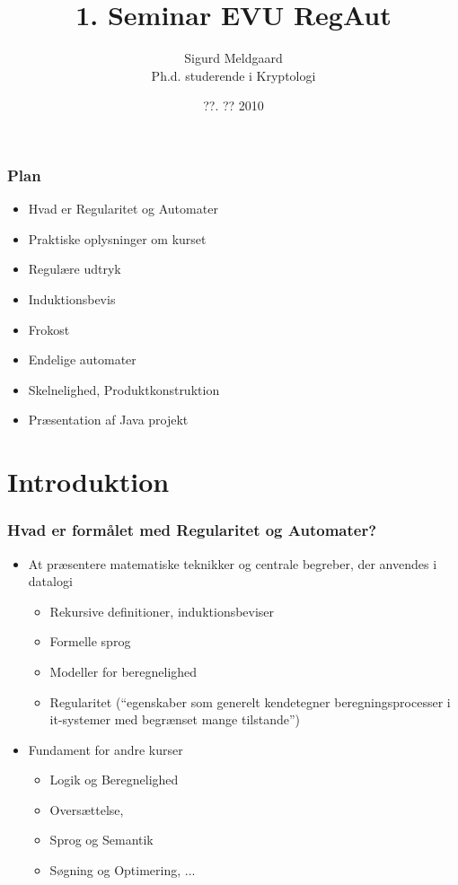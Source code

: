 \documentclass[]{beamer}
\title{1. Seminar EVU RegAut}
\author[S. Meldgaard]{Sigurd Meldgaard\\
Ph.d. studerende i Kryptologi}
\date{??. ?? 2010}
\institute[AU]{Datalogisk Institut\\
  Århus Universitet\\
  \texttt{stm@cs.au.dk}
}
\newcommand{\ignore}[1]{}
\begin{document}
\maketitle
\begin{frame}
\frametitle{Plan}

\begin{itemize}[<alert@+>]
\item Hvad er Regularitet og Automater
\item Praktiske oplysninger om kurset
\item Regulære udtryk
\item Induktionsbevis
\item Frokost
\item Endelige automater
\item Skelnelighed, Produktkonstruktion
\item Præsentation af Java projekt
  \end{itemize}
\end{frame}

\section{Introduktion}

\begin{frame}
  \frametitle{Hvad er formålet med Regularitet og Automater?}
  \begin{itemize}[<+->]
  \item At præsentere matematiske teknikker og centrale begreber, der anvendes i datalogi
    \begin{itemize}
    \item Rekursive definitioner, induktionsbeviser
    \item Formelle sprog
    \item Modeller for beregnelighed
    \item Regularitet (``egenskaber som generelt kendetegner beregningsprocesser i it-systemer med begrænset mange tilstande'')    
    \end{itemize}
  \item Fundament for andre kurser
    \begin{itemize}
    \item Logik og Beregnelighed
    \item Oversættelse, 
    \item Sprog og Semantik
    \item Søgning og Optimering, ...
    \end{itemize}
  \end{itemize}
\end{frame}
\end{document}
